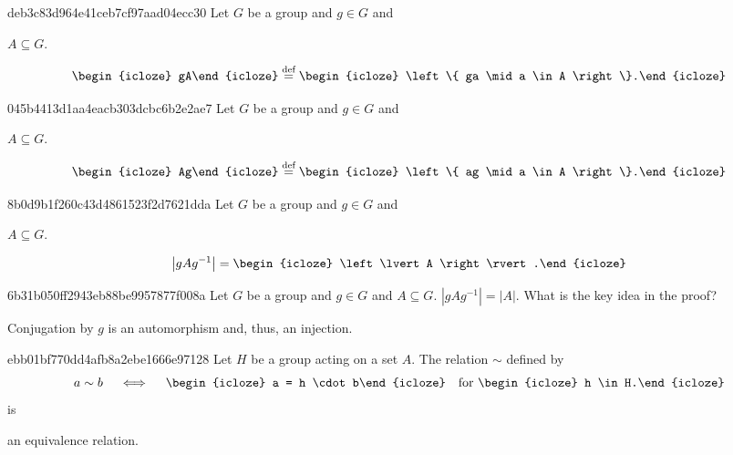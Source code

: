 \begin{note}{deb3c83d964e41ceb7cf97aad04ecc30}
    Let \({ G }\) be a group and \({ g \in G }\) and \begin{icloze}{3}\({ A \subseteq G }\).\end{icloze}
    \[
        \begin{icloze}{2}gA\end{icloze} \overset{\text{def}}= \begin{icloze}{1}\left\{ ga \mid a \in A \right\}.\end{icloze}
    \]
\end{note}

\begin{note}{045b4413d1aa4eacb303dcbc6b2e2ae7}
    Let \({ G }\) be a group and \({ g \in G }\) and \begin{icloze}{3}\({ A \subseteq G }\).\end{icloze}
    \[
        \begin{icloze}{2}Ag\end{icloze} \overset{\text{def}}= \begin{icloze}{1}\left\{ ag \mid a \in A \right\}.\end{icloze}
    \]
\end{note}

\begin{note}{8b0d9b1f260c43d4861523f2d7621dda}
    Let \({ G }\) be a group and \({ g \in G }\) and \begin{icloze}{2}\({ A \subseteq G }\).\end{icloze}
    \[
        \left\lvert gAg^{-1} \right\rvert = \begin{icloze}{1}\left\lvert A \right\rvert.\end{icloze}
    \]
\end{note}

\begin{note}{6b31b050ff2943eb88be9957877f008a}
    Let \({ G }\) be a group and \({ g \in G }\) and \({ A \subseteq G }\).
    \({ \left\lvert gAg^{-1} \right\rvert = \left\lvert A \right\rvert }\).
    What is the key idea in the proof?

    \begin{cloze}{1}
        Conjugation by \({ g }\) is an automorphism and, thus, an injection.
    \end{cloze}
\end{note}

\begin{note}{ebb01bf770dd4afb8a2ebe1666e97128}
    Let \({ H }\) be a group acting on a set \({ A }\).
    The relation \({ \sim }\) defined by
    \[
        a \sim b \quad \iff \quad \begin{icloze}{2}a = h \cdot b\end{icloze} \quad \text{for}\ \begin{icloze}{3}h \in H.\end{icloze}
    \]
    is \begin{icloze}{1}an equivalence relation.\end{icloze}
\end{note}

